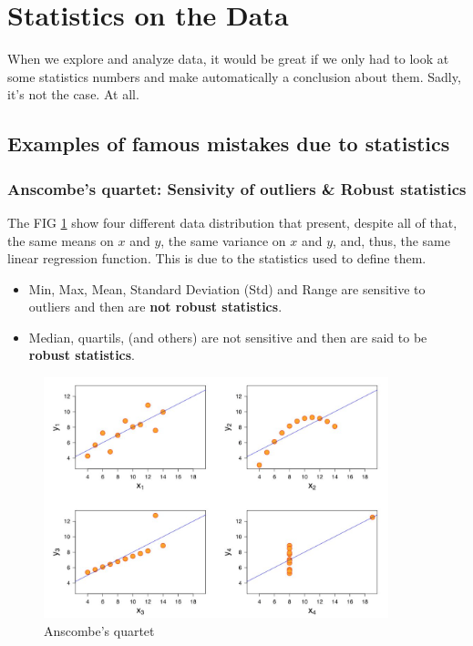 
\section{Statistics on the Data}

When we explore and analyze data, it would be great if we only had to look at some statistics numbers and make automatically a conclusion about them. Sadly, it's not the case. At all.
\subsection{Examples of famous mistakes due to statistics}

\subsubsection{Anscombe's quartet: Sensivity of outliers \& Robust statistics}

The FIG \ref{pic:anscombe} show four different data distribution that present, despite all of that, the same means on $x$ and $y$, the same variance on $x$ and $y$, and, thus, the same linear regression function. This is due to the statistics used to define them. 

\begin{itemize}
    \item Min, Max, Mean, Standard Deviation (Std) and Range are sensitive to outliers and then are \textbf{not robust statistics}.
    \item Median, quartils, (and others) are not sensitive and then are said to be \textbf{robust statistics}. 
\end{itemize}



\begin{figure}[h]%
 \centering
 \includegraphics[width=10cm]{./img/05/anscombe}
 \caption{\label{pic:anscombe} Anscombe's quartet}
\end{figure}

